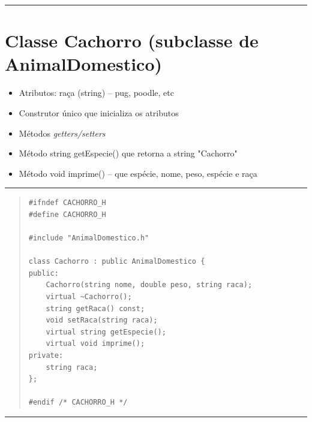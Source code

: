 \documentclass[12pt]{article}
\begin{document}
\par\noindent\rule{\textwidth}{0.4pt}

\section*{Classe {\sf Cachorro} (subclasse de {\sf AnimalDomestico})}

\begin{itemize}

\item Atributos: raça ({\sf string}) -- pug, poodle, etc

\item Construtor único que inicializa os atributos

\item Métodos {\it getters/setters}

\item Método {\sf string getEspecie()} que retorna a string "Cachorro"

\item Método {\sf void imprime()} -- que espécie, nome, peso, espécie e raça

\end{itemize}

\par\noindent\rule{\textwidth}{0.4pt}

\begin{quote}
\begin{scriptsize}
\begin{verbatim}
#ifndef CACHORRO_H
#define CACHORRO_H

#include "AnimalDomestico.h"

class Cachorro : public AnimalDomestico {
public:
    Cachorro(string nome, double peso, string raca);
    virtual ~Cachorro();
    string getRaca() const;
    void setRaca(string raca);
    virtual string getEspecie();
    virtual void imprime();
private:
    string raca;
};

#endif /* CACHORRO_H */
\end{verbatim}
\end{scriptsize}
\end{quote}

\par\noindent\rule{\textwidth}{0.4pt}
\end{document}

